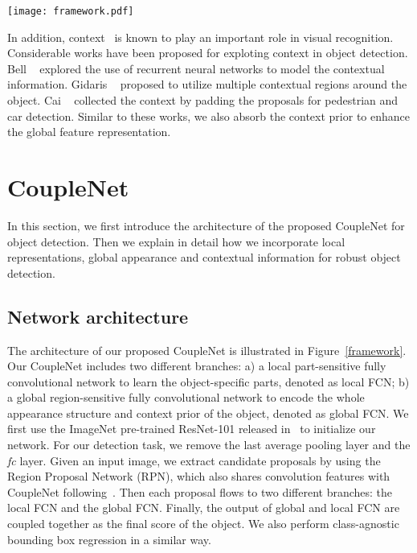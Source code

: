 \documentclass[10pt,twocolumn,letterpaper]{article}
\begin{document}
\begin{figure*}[thbp]
\begin{center}
\texttt{[image: framework.pdf]}
\end{center}
  \caption{The architecture of the proposed CoupleNet. We use ResNet-101 as the basic feature extraction network. Given an input image, we first exploit Region Proposal Network (RPN)~\cite{ren2015faster} to generate candidate proposals. Then each proposal flows to two different branches: local FCN and global FCN, in order to extract the global structure information and learn the object-specific parts respectively. Finally the output of the two branches are coupled together to predict the object categories.}
\label{framework}
\end{figure*}

In addition, context~\cite{wang2014spatiotemporal} is known to play an important role in visual recognition. Considerable works have been proposed for exploting context in object detection. Bell \etal~\cite{bell16ion} explored the use of recurrent neural networks to model the contextual information. Gidaris \etal~\cite{gidaris2015object} proposed to utilize multiple contextual regions around the object. Cai \etal~\cite{cai2016unified} collected the context by padding the proposals for pedestrian and car detection. Similar to these works, we also absorb the context prior to enhance the global feature representation.

\section{CoupleNet}
In this section, we first introduce the architecture of the proposed CoupleNet for object detection. Then we explain in detail how we incorporate local representations, global appearance and contextual information for robust object detection.

\subsection{Network architecture}
The architecture of our proposed CoupleNet is illustrated in Figure~\ref{framework}. Our CoupleNet includes two different branches: a) a local part-sensitive fully convolutional network to learn the object-specific parts, denoted as local FCN; b) a global region-sensitive fully convolutional network to encode the whole appearance structure and context prior of the object, denoted as global FCN. We first use the ImageNet pre-trained ResNet-101 released in~\cite{he2016deep} to initialize our network. For our detection task, we remove the last average pooling layer and the \textit{fc} layer. Given an input image, we extract candidate proposals by using the Region Proposal Network (RPN), which also shares convolution features with CoupleNet following~\cite{ren2015faster}. Then each proposal flows to two different branches: the local FCN and the global FCN. Finally, the output of global and local FCN are coupled together as the final score of the object. We also perform class-agnostic bounding box regression in a similar way.
\end{document}
